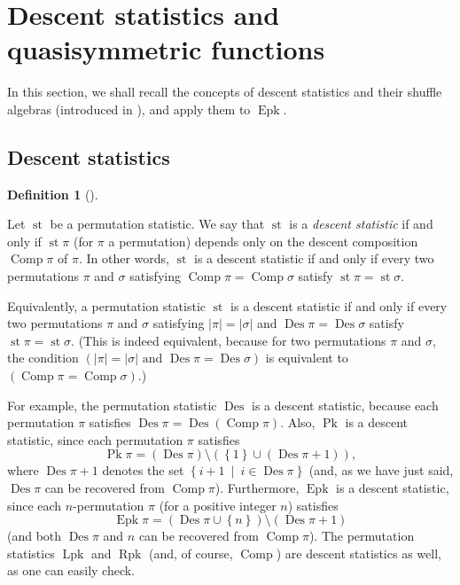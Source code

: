 \documentclass[numbers=enddot,12pt,final,onecolumn,notitlepage]{scrartcl}%
\theoremstyle{definition}
\newtheorem{defi}[theo]{Definition}
\newenvironment{definition}[1][]
{\begin{defi}[#1]\begin{leftbar}}
{\end{leftbar}\end{defi}}
\begin{document}
\section{\label{sect.Descent}Descent statistics and quasisymmetric functions}

In this section, we shall recall the concepts of descent statistics and their
shuffle algebras (introduced in \cite{part1}), and apply them to
$\operatorname*{Epk}$.

\subsection{Descent statistics}

\begin{definition}
Let $\operatorname*{st}$ be a permutation statistic. We say that
$\operatorname*{st}$ is a \textit{descent statistic} if and only if
$\operatorname*{st}\pi$ (for $\pi$ a permutation) depends only on the descent
composition $\operatorname*{Comp}\pi$ of $\pi$. In other words,
$\operatorname*{st}$ is a descent statistic if and only if every two
permutations $\pi$ and $\sigma$ satisfying $\operatorname*{Comp}%
\pi=\operatorname*{Comp}\sigma$ satisfy $\operatorname*{st}\pi
=\operatorname*{st}\sigma$.
\end{definition}

Equivalently, a permutation statistic $\operatorname*{st}$ is a descent
statistic if and only if every two permutations $\pi$ and $\sigma$ satisfying
$\left\vert \pi\right\vert =\left\vert \sigma\right\vert $ and
$\operatorname*{Des}\pi=\operatorname*{Des}\sigma$ satisfy $\operatorname*{st}%
\pi=\operatorname*{st}\sigma$. (This is indeed equivalent, because for two
permutations $\pi$ and $\sigma$, the condition $\left(  \left\vert
\pi\right\vert =\left\vert \sigma\right\vert \text{ and }\operatorname*{Des}%
\pi=\operatorname*{Des}\sigma\right)  $ is equivalent to $\left(
\operatorname*{Comp}\pi=\operatorname*{Comp}\sigma\right)  $.)

For example, the permutation statistic $\operatorname*{Des}$ is a descent
statistic, because each permutation $\pi$ satisfies $\operatorname*{Des}%
\pi=\operatorname*{Des}\left(  \operatorname*{Comp}\pi\right)  $. Also,
$\operatorname*{Pk}$ is a descent statistic, since each permutation $\pi$
satisfies%
\[
\operatorname*{Pk}\pi=\left(  \operatorname*{Des}\pi\right)  \setminus\left(
\left\{  1\right\}  \cup\left(  \operatorname*{Des}\pi+1\right)  \right)  ,
\]
where $\operatorname*{Des}\pi+1$ denotes the set $\left\{  i+1\ \mid
\ i\in\operatorname*{Des}\pi\right\}  $ (and, as we have just said,
$\operatorname*{Des}\pi$ can be recovered from $\operatorname*{Comp}\pi$).
Furthermore, $\operatorname*{Epk}$ is a descent statistic, since each
$n$-permutation $\pi$ (for a positive integer $n$) satisfies%
\[
\operatorname*{Epk}\pi=\left(  \operatorname*{Des}\pi\cup\left\{  n\right\}
\right)  \setminus\left(  \operatorname*{Des}\pi+1\right)
\]
(and both $\operatorname*{Des}\pi$ and $n$ can be recovered from
$\operatorname*{Comp}\pi$). The permutation statistics $\operatorname*{Lpk}$
and $\operatorname*{Rpk}$ (and, of course, $\operatorname*{Comp}$) are descent
statistics as well, as one can easily check.
\end{document}
